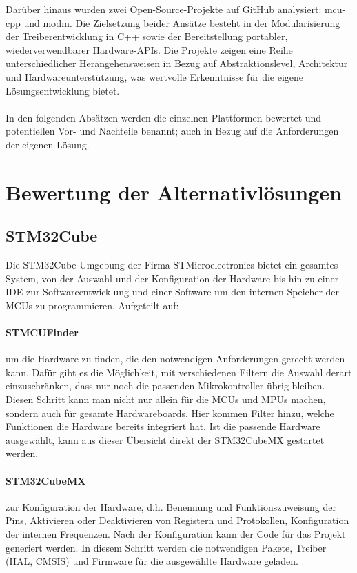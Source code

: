 Darüber hinaus wurden zwei Open-Source-Projekte auf GitHub analysiert: mcu-cpp und modm. 
Die Zielsetzung beider Ansätze besteht in der Modularisierung der Treiberentwicklung in C++ sowie der Bereitstellung portabler, wiederverwendbarer Hardware-APIs. 
Die Projekte zeigen eine Reihe unterschiedlicher Herangehensweisen in Bezug auf Abstraktionslevel, Architektur und Hardwareunterstützung, was wertvolle Erkenntnisse für die eigene Lösungsentwicklung bietet.
\\
\\
In den folgenden Absätzen werden die einzelnen Plattformen bewertet und potentiellen Vor- und Nachteile benannt; auch in Bezug auf die Anforderungen der eigenen Lösung. 

\section{Bewertung der Alternativlösungen}
\subsection{STM32Cube}
Die STM32Cube-Umgebung der Firma STMicroelectronics bietet ein gesamtes System, von der Auswahl und der Konfiguration der Hardware bis hin zu einer IDE zur Softwareentwicklung und einer Software um den internen Speicher der MCUs zu programmieren.
Aufgeteilt auf:
\paragraph{STMCUFinder}
	um die Hardware zu finden, die den notwendigen Anforderungen gerecht werden kann.
	Dafür gibt es die Möglichkeit, mit verschiedenen Filtern die Auswahl derart einzuschränken, dass nur noch die passenden Mikrokontroller übrig bleiben.
	Diesen Schritt kann man nicht nur allein für die MCUs und MPUs machen, sondern auch für gesamte Hardwareboards.
	Hier kommen Filter hinzu, welche Funktionen die Hardware bereits integriert hat.
	Ist die passende Hardware ausgewählt, kann aus dieser Übersicht direkt der STM32CubeMX gestartet werden.

\paragraph{STM32CubeMX} 
	zur Konfiguration der Hardware, d.h. Benennung und Funktionszuweisung der Pins, Aktivieren oder Deaktivieren von Registern und Protokollen, Konfiguration der internen Frequenzen. 
	Nach der Konfiguration kann der Code für das Projekt generiert werden.
	In diesem Schritt werden die notwendigen Pakete, Treiber (HAL, CMSIS) und Firmware für die ausgewählte Hardware geladen.

